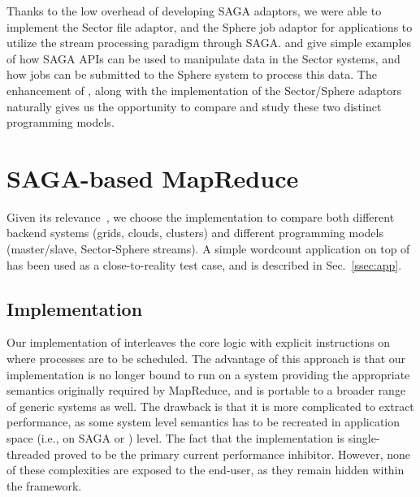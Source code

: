 \documentclass[3p,twocolumn]{elsarticle}
\begin{document}
Thanks to the low overhead of developing SAGA adaptors, we were able
to implement the Sector file adaptor, and the Sphere job adaptor for
applications to utilize the stream processing paradigm through SAGA.
 and  give simple examples of how SAGA APIs
can be used to manipulate data in the Sector systems, and how jobs can
be submitted to the Sphere system to process this data.  The
enhancement of \sagamapreduce, along with the implementation of the
Sector/Sphere adaptors naturally gives us the opportunity to compare
and study these two distinct programming models.


\section{SAGA-based MapReduce}
\label{sec:mr}

 Given its relevance~\cite{saga_ccgrid09}, we choose the \smr
 implementation to compare both different backend systems (grids,
 clouds, clusters) and different programming models (master/slave,
 Sector-Sphere streams).  A simple wordcount application on top of
 \smr has been used as a close-to-reality test case, and is
 described in Sec.~\ref{ssec:app}.


\subsection{\sagamapreduce Implementation}


Our implementation of \sagamapreduce interleaves the core \mr logic
with explicit instructions on where processes are to be scheduled.
The advantage of this approach is that our implementation is no longer
bound to run on a system providing the appropriate semantics
originally required by MapReduce, and is portable to a broader range
of generic systems as well.  The drawback is that it is more
complicated to extract performance, as some system level semantics has
to be recreated in application space (i.e., on SAGA or \smr) level.
The fact that the implementation is single-threaded proved to be the
primary current performance inhibitor.  However, none of these
complexities are exposed to the end-user, as they remain hidden within
the framework. 
\end{document}
